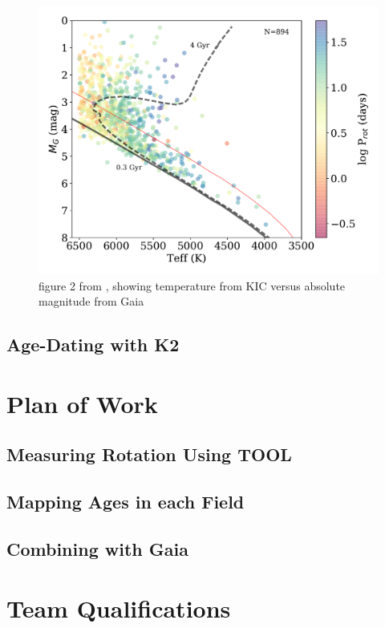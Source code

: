 \documentclass[12pt]{article}
\begin{document}
\begin{figure}[!th]
\centering
\includegraphics[width=5in]{davenport2016_fig2}
\caption{figure 2 from \citet{davenport2017}, showing temperature from KIC versus absolute magnitude from Gaia}
\label{fig:cmd}
\end{figure}


\subsection{Age-Dating with K2}

\section{Plan of Work}

\subsection{Measuring Rotation Using TOOL}

\subsection{Mapping Ages in each Field}

\subsection{Combining with Gaia}


\section{Team Qualifications}




\end{document}
